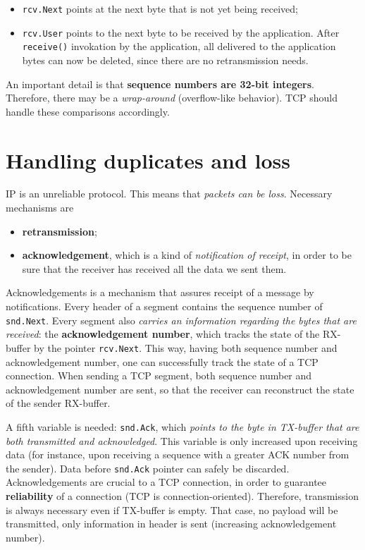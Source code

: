 \documentclass[a4paper, 11pt]{report}
\begin{document}
\begin{itemize}
	\item \texttt{rcv.Next} points at the next byte that is not yet being
		received;
	\item \texttt{rcv.User} points to the next byte to be received by the
		application. After \texttt{receive()} invokation by the
		application, all delivered to the application bytes can now be
		deleted, since there are no retransmission needs. 
\end{itemize}

An important detail is that \textbf{sequence numbers are 32-bit integers}.
Therefore, there may be a \emph{wrap-around} (overflow-like behavior). TCP
should handle these comparisons accordingly.

\section{Handling duplicates and loss}

IP is an unreliable protocol. This means that \emph{packets can be loss}.
Necessary mechanisms are

\begin{itemize}
	\item \textbf{retransmission};
	\item \textbf{acknowledgement}, which is a kind of \emph{notification
		of receipt}, in order to be sure that the receiver has received
		all the data we sent them.
\end{itemize}

Acknowledgements is a mechanism that assures receipt of a message by
notifications. Every header of a segment contains the sequence number of
\texttt{snd.Next}. Every segment also \emph{carries an information regarding
the bytes that are received}: the \textbf{acknowledgement number}, which tracks
the state of the RX-buffer by the pointer \texttt{rcv.Next}. This way, having
both sequence number and acknowledgement number, one can successfully track the
state of a TCP connection. When sending a TCP segment, both sequence number and
acknowledgement number are sent, so that the receiver can reconstruct the state
of the sender RX-buffer.

A fifth variable is needed: \texttt{snd.Ack}, which \emph{points to the byte in
TX-buffer that are both transmitted and acknowledged}. This variable is only
increased upon receiving data (for instance, upon receiving a sequence with a
greater ACK number from the sender). Data before \texttt{snd.Ack} pointer can
safely be discarded. Acknowledgements are crucial to a TCP connection, in order
to guarantee \textbf{reliability} of a connection (TCP is connection-oriented).
Therefore, transmission is always necessary even if TX-buffer is empty. That
case, no payload will be transmitted, only information in header is sent
(increasing acknowledgement number). 
\end{document}

